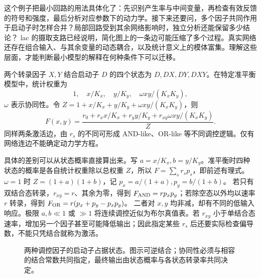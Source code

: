 这个例子把最小回路的用法具体化了：先识别产生率与中间变量，再检查有效反馈的符号和强度，最后分析对应参数下的动力学。接下来还要问，多个因子共同作用于启动子时怎样合并？局部回路受到其余网络影响时，独立分析还能保留多少结论？
lac 的摄取支路已经说明，简化图上的一条边可能压缩了多个过程。真实网络还存在组合输入、与其余变量的动态耦合，以及统计意义上的模体富集。理解这些层面，才能判断最小模型的解释在何种条件下可以迁移。

两个转录因子 $X,Y$ 结合启动子 $D$ 的四个状态为 $D,DX,DY,DXY$。在特定准平衡模型中，统计权重为
\begin{equation}1,\quad x/K_x,\quad y/K_y,\quad\omega xy/(K_xK_y),\end{equation}
$\omega$ 表示协同性。令 $Z=1+x/K_x+y/K_y+\omega xy/(K_xK_y)$，则
\begin{equation}F(x,y)=\frac{r_0+r_xx/K_x+r_yy/K_y+r_{xy}\omega xy/(K_xK_y)}{Z}.\end{equation}
同样两条激活边，由 $r_s$ 的不同可形成 AND-like、OR-like 等不同调控逻辑。仅有网络连边不能确定动力学方程。

具体的差别可以从状态概率直接算出来。写 $a=x/K_x,b=y/K_y$。准平衡时四种状态的概率是各自统计权重除以总权重 $Z$，所以 $F=\sum_s r_s p_s$，即前述有理式。$\omega=1$ 时 $Z=(1+a)(1+b)$，记 $p_x=a/(1+a),p_y=b/(1+b)$。
若只有双结合态转录，$r_{xy}=r$、其余为零，得到
$F_{\rm AND}=rp_xp_y$；若除空态以外均以速率 $r$ 转录，得到
$F_{\rm OR}=r(p_x+p_y-p_xp_y)$。
二者对 $x,y$ 均非减，却有不同的低输入响应。极限 $a,b\ll1$ 或 $\gg1$ 将连续调控近似为布尔真值表。若 $r_{xy}$ 小于单结合态速率，增加另一个因子甚至可能降低输出；因此指定某些 $r_s$ 后还要实际检查偏导数，不能只凭结合就称为激活。
\begin{figure}[H]\centering
{}
\caption{两种调控因子的启动子占据状态。图示可逆结合；协同性必须与相容的结合常数共同指定，最终输出由状态概率与各状态转录率共同决定。}
\end{figure}

